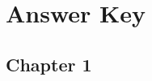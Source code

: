 \documentclass[openany]{book}
\begin{document}




\chapter{Answer Key}




\section{Chapter 1}
\end{document}
